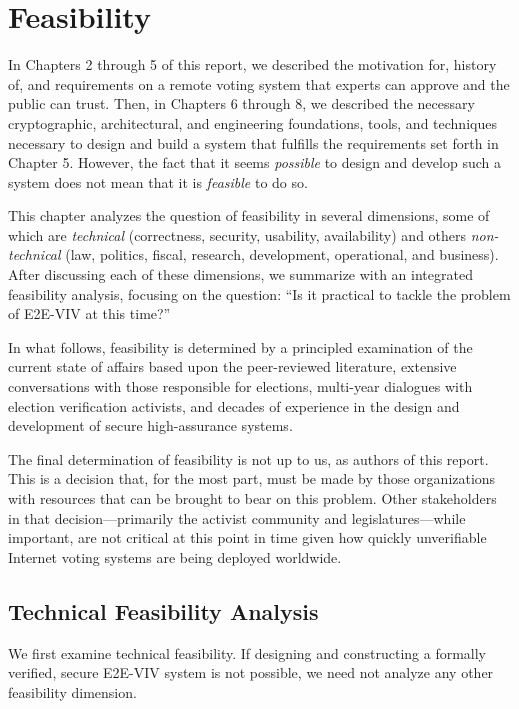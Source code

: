 \chapter{Feasibility}
\label{chapter:feasibility}

In Chapters 2 through 5 of this report, we described the motivation
for, history of, and requirements on a remote voting system that
experts can approve and the public can trust. Then, in Chapters 6
through 8, we described the necessary cryptographic, architectural,
and engineering foundations, tools, and techniques necessary to design
and build a system that fulfills the requirements set forth in Chapter
5. However, the fact that it seems \emph{possible} to design and
develop such a system does not mean that it is \emph{feasible} to do
so.

This chapter analyzes the question of feasibility in several
dimensions, some of which are \emph{technical} (correctness, security,
usability, availability) and others \emph{non-technical} (law,
politics, fiscal, research, development, operational, and
business). After discussing each of these dimensions, we summarize
with an integrated feasibility analysis, focusing on the question:
``Is it practical to tackle the problem of E2E-VIV at this time?''

In what follows, feasibility is determined by a principled examination
of the current state of affairs based upon the peer-reviewed
literature, extensive conversations with those responsible for
elections, multi-year dialogues with election verification activists,
and decades of experience in the design and development of secure
high-assurance systems.

The final determination of feasibility is not up to us, as authors of
this report. This is a decision that, for the most part, must be made
by those organizations with resources that can be brought to bear on
this problem. Other stakeholders in that decision---primarily the
activist community and legislatures---while important, are not
critical at this point in time given how quickly unverifiable Internet
voting systems are being deployed worldwide.

\section{Technical Feasibility Analysis}

We first examine technical feasibility. If designing and constructing
a formally verified, secure E2E-VIV system is not possible, we need
not analyze any other feasibility dimension.

